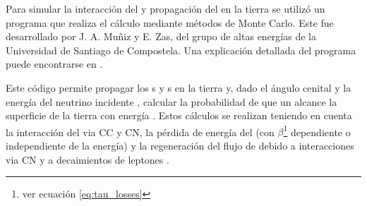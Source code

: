		Para simular la interacción del \nutau{} y propagaci\'on del \tauon{} en la tierra se utiliz\'o un programa que realiza el c\'alculo mediante m\'etodos de Monte Carlo. Este fue desarrollado por J. A. Mu\~niz y E. Zas, del grupo de altas energ\'ias de la Universidad de Santiago de Compostela.
		Una explicaci\'on detallada del programa puede encontrarse en \cite{gap_tau_tierra}.
		
		Este c\'odigo permite propagar los \nutau{}s y \tauon{}s en la tierra y, dado el \'angulo cenital \tita{} y la energ\'ia del neutrino incidente \enu{}, calcular la probabilidad de que un \tauon{} alcance la superficie de la tierra con energ\'ia \etau{}.
		Estos c\'alculos se realizan teniendo en cuenta la interacci\'on del \nutau{} via CC y CN, la p\'erdida de energ\'ia del \tauon{} (con $\beta$\footnote{ver ecuaci\'on \ref{eq:tau_losses}} dependiente o independiente de la energ\'ia) y la regeneraci\'on del flujo de \nutau{} debido a interacciones via CN y a decaimientos de leptones \tauon{}.
		
